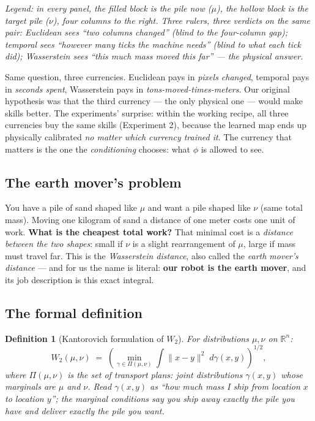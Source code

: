 \documentclass[11pt,a4paper]{article}
\newtheorem{definition}{Definition}
\begin{document}
\begin{center}
{\scriptsize\emph{Legend: in every panel, the filled block is the pile now
($\mu$), the hollow block is the target pile ($\nu$), four columns to the
right. Three rulers, three verdicts on the same pair: Euclidean sees
``two columns changed'' (blind to the four-column gap); temporal sees
``however many ticks the machine needs'' (blind to what each tick did);
Wasserstein sees ``this much mass moved this far'' --- the physical answer.}}
\end{center}

\begin{intuition}
Same question, three currencies. Euclidean pays in \emph{pixels changed},
temporal pays in \emph{seconds spent}, Wasserstein pays in
\emph{tons-moved-times-meters}. Our original hypothesis was that the third
currency --- the only physical one --- would make skills better. The
experiments' surprise: within the working recipe, all three currencies buy the
same skills (Experiment 2), because the learned map ends up physically
calibrated \emph{no matter which currency trained it}. The currency that
matters is the one the \emph{conditioning} chooses: what $\phi$ is allowed to
see.
\end{intuition}

\subsection{The earth mover's problem}

You have a pile of sand shaped like $\mu$ and want a pile shaped like $\nu$
(same total mass). Moving one kilogram of sand a distance of one meter costs one
unit of work. \textbf{What is the cheapest total work?} That minimal cost is a
\emph{distance between the two shapes}: small if $\nu$ is a slight rearrangement
of $\mu$, large if mass must travel far. This is the \emph{Wasserstein distance},
also called the \emph{earth mover's distance} --- and for us the name is literal:
\textbf{our robot is the earth mover}, and its job description is this exact
integral.

\subsection{The formal definition}

\begin{definition}[Kantorovich formulation of $W_2$]
For distributions $\mu, \nu$ on $\mathbb{R}^n$:
\[
W_2(\mu,\nu) \;=\; \left( \min_{\gamma \in \Pi(\mu,\nu)}
\int \|x - y\|^2 \; d\gamma(x,y) \right)^{1/2},
\]
where $\Pi(\mu,\nu)$ is the set of \emph{transport plans}: joint distributions
$\gamma(x,y)$ whose marginals are $\mu$ and $\nu$. Read $\gamma(x,y)$ as ``how
much mass I ship from location $x$ to location $y$''; the marginal conditions say
you ship away exactly the pile you have and deliver exactly the pile you want.
\end{definition}
\end{document}
